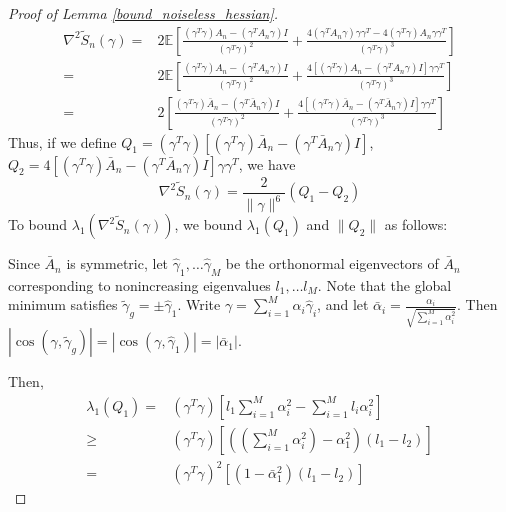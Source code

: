 \documentclass{article} \usepackage{iclr2019_conference,times}
\newcommand{\expe}{\mathbb{E}}
\begin{document}
\begin{proof}[Proof of Lemma \ref{bound_noiseless_hessian}]
\begin{equation}
\label{noiseless_hess}
\begin{split}
    \nabla^2 \tilde{S}_n(\gamma) =& 2 \expe \left[\frac{(\gamma^T \gamma) A_n - (\gamma^T A_n \gamma) I}{(\gamma^T \gamma)^2} + \frac{4 (\gamma^T A_n \gamma) \gamma \gamma^T - 4 (\gamma^T \gamma) A_n \gamma \gamma^T}{(\gamma^T \gamma)^3}\right]\\
    =& 2 \expe \left[\frac{(\gamma^T \gamma) A_n - (\gamma^T A_n \gamma) I}{(\gamma^T \gamma)^2} + \frac{4 [(\gamma^T \gamma) A_n - (\gamma^T A_n \gamma) I] \gamma \gamma^T }{(\gamma^T \gamma)^3}\right] \\
    =& 2 \left[\frac{(\gamma^T \gamma) \bar{A}_n - (\gamma^T \bar{A}_n \gamma) I}{(\gamma^T \gamma)^2} + \frac{4 [(\gamma^T \gamma) \bar{A}_n - (\gamma^T \bar{A}_n \gamma) I] \gamma \gamma^T }{(\gamma^T \gamma)^3}\right]
\end{split}
\end{equation}
Thus, if we define $Q_1 = (\gamma^T \gamma)[(\gamma^T \gamma) \bar{A}_n - (\gamma^T \bar{A}_n \gamma) I]$, $Q_2 = 4 [(\gamma^T \gamma) \bar{A}_n - (\gamma^T \bar{A}_n \gamma) I] \gamma \gamma^T$, we have 
\begin{equation}
    \nabla^2 \tilde{S}_n(\gamma) = \frac{2}{\| \gamma \|^6} (Q_1 - Q_2)
\end{equation}
To bound $\lambda_1(\nabla^2 \tilde{S}_n(\gamma))$, we bound $\lambda_1 (Q_1)$ and $\| Q_2\|$ as follows:

Since $\bar{A}_n$ is symmetric, let $\hat{\gamma}_{1}, \dots \hat{\gamma}_{M}$ be the orthonormal eigenvectors of $\bar{A}_n$ corresponding to nonincreasing eigenvalues $l_1, \dots l_M$. Note that the global minimum satisfies $\tilde{\gamma}_g = \pm \hat{\gamma}_1$. Write $\gamma = \sum_{i=1}^M \alpha_i \hat{\gamma}_i$, and let $\bar{\alpha}_i = \frac{\alpha_i}{\sqrt{\sum_{i=1}^M \alpha_i^2}}$. Then $|\cos(\gamma, \tilde{\gamma}_g)| = |\cos(\gamma, \hat{\gamma}_1)| = |\bar{\alpha}_1|$.

Then,
\begin{equation}
    \begin{split}
        \lambda_{1}(Q_1) =& (\gamma^T \gamma) \left[l_1 \sum_{i=1}^M \alpha_i^2 - \sum_{i=1}^M l_i \alpha_i^2\right] \\
        \geq& (\gamma^T \gamma)\left[\left((\sum_{i=1}^M \alpha_i^2) - \alpha_1^2\right) (l_1 - l_2)\right]\\
        =& (\gamma^T \gamma)^2 [(1 - \bar{\alpha}_1^2) (l_1 - l_2)]
    \end{split}
\end{equation}


\end{proof}
\end{document}
